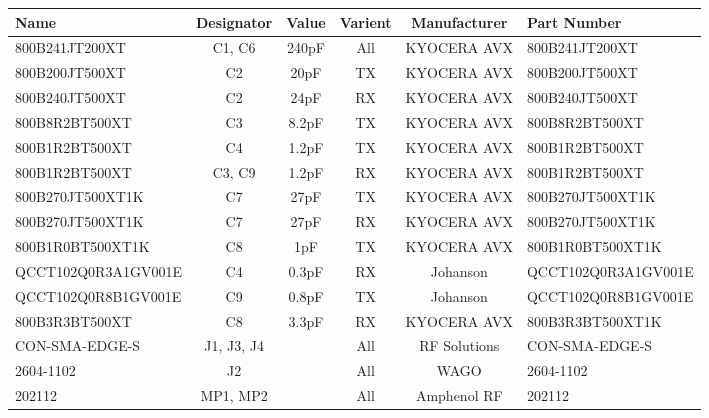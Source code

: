 \documentclass{standalone}
\begin{document}
\centering
\begin{tabular}{lccccl}
	\toprule
	\textbf{Name}       & \textbf{Designator} & \textbf{Value} & \textbf{Varient} & \textbf{Manufacturer} & \textbf{Part Number} \\
	\midrule
	800B241JT200XT      & C1, C6              & 240pF          & All              & KYOCERA AVX           & 800B241JT200XT       \\
	800B200JT500XT      & C2                  & 20pF           & TX               & KYOCERA AVX           & 800B200JT500XT       \\
	800B240JT500XT      & C2                  & 24pF           & RX               & KYOCERA AVX           & 800B240JT500XT       \\
	800B8R2BT500XT      & C3                  & 8.2pF          & TX               & KYOCERA AVX           & 800B8R2BT500XT       \\
	800B1R2BT500XT      & C4                  & 1.2pF          & TX               & KYOCERA AVX           & 800B1R2BT500XT       \\
	800B1R2BT500XT      & C3, C9              & 1.2pF          & RX               & KYOCERA AVX           & 800B1R2BT500XT       \\
	800B270JT500XT1K    & C7                  & 27pF           & TX               & KYOCERA AVX           & 800B270JT500XT1K     \\
	800B270JT500XT1K    & C7                  & 27pF           & RX               & KYOCERA AVX           & 800B270JT500XT1K     \\
	800B1R0BT500XT1K    & C8                  & 1pF            & TX               & KYOCERA AVX           & 800B1R0BT500XT1K     \\
	QCCT102Q0R3A1GV001E & C4                  & 0.3pF          & RX               & Johanson              & QCCT102Q0R3A1GV001E  \\
	QCCT102Q0R8B1GV001E & C9                  & 0.8pF          & TX               & Johanson              & QCCT102Q0R8B1GV001E  \\
	800B3R3BT500XT      & C8                  & 3.3pF          & RX               & KYOCERA AVX           & 800B3R3BT500XT1K     \\
	CON-SMA-EDGE-S      & J1, J3, J4          &                & All              & RF Solutions          & CON-SMA-EDGE-S       \\
	2604-1102           & J2                  &                & All              & WAGO                  & 2604-1102            \\
	202112              & MP1, MP2            &                & All              & Amphenol RF           & 202112               \\
	\bottomrule
\end{tabular}
\end{document}
